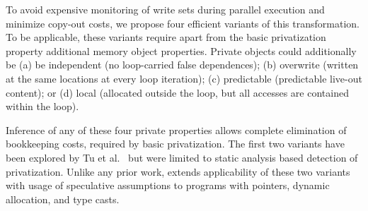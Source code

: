 To avoid expensive monitoring of write sets during parallel execution
and minimize copy-out costs, we propose four efficient variants of
this transformation.
%
To be applicable, these variants require apart from the basic
privatization property additional memory object properties.  Private
objects could additionally be (a) be independent (no loop-carried false
dependences); (b) overwrite (written at the same locations at every
loop iteration); (c) predictable (predictable live-out content);
or (d) local (allocated outside the loop, but all accesses are
contained within the loop).

Inference of any of these four private properties allows complete
elimination of bookkeeping costs, required by basic privatization.
The first two variants have been explored by Tu et
al.~\cite{tu:94:lcpc} but were limited to static analysis based
detection of privatization. Unlike any prior work, \name extends
applicability of these two variants with usage of speculative
assumptions to programs with pointers, dynamic allocation, and type
casts.





\lstset{basicstyle=\ttfamily, numbers=left, numberstyle=\tiny,
  stepnumber=1, numbersep=5pt}

